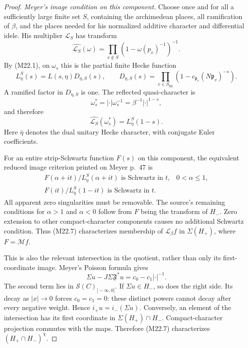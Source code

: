 \begin{proof}
\emph{Meyer's image condition on this component.}
Choose once and for all a sufficiently large finite
set \(S\), containing the archimedean places, all
ramification of \(\beta\), and the places needed for
his normalized additive character and differential
idele.  His multiplier \(\mathcal L_S\) has transform
\[
 \widehat{\mathcal L_S}(\omega)
       =\prod_{v\notin S}(1-\omega(p_v)^{-1})^{-1}.
\]
By (M22.1), on \(\omega_s\) this is the partial finite
Hecke function
\[
 L_\eta^S(s)
       =L(s,\eta)D_{\eta,S}(s),\qquad
 D_{\eta,S}(s)=
        \prod_{v\in S_{\mathrm{fin}}}
             (1-c_{\mathfrak p_v}(N\mathfrak p_v)^{-s}).         \tag{M22.5}
\]
A ramified factor in \(D_{\eta,S}\) is one.
The reflected quasi-character is
\[
 \omega_s^*=|\cdot|\omega_s^{-1}
                    =\beta^{-1}|\cdot|^{1-s},
\]
and therefore
\[
              \widehat{\mathcal L_S}(\omega_s^*)
                       =L_{\bar\eta}^S(1-s).                   \tag{M22.6}
\]
Here \(\bar\eta\) denotes the dual unitary Hecke
character, with conjugate Euler coefficients.

For an entire strip-Schwartz function \(F(s)\)
on this component, the equivalent reduced
image criterion printed on Meyer p.~47 is
\[
 \begin{array}{ll}
 F(\alpha+it)/L_\eta^S(\alpha+it)
        \text{ is Schwartz in }t,&0<\alpha\le1,\\[2mm]
 F(it)/L_{\bar\eta}^S(1-it)
        \text{ is Schwartz in }t.&
 \end{array}                                                    \tag{M22.7}
\]
All apparent zero singularities must be removable.
The source's remaining conditions for
\(\alpha>1\) and \(\alpha<0\) follow from \(F\)
being the transform of \(H_-\).
Zero extension to other compact-character
components causes no additional Schwartz condition.
Thus (M22.7) characterizes membership of
\(\mathcal L_\beta f\) in \(\Sigma(H_+)\),
where \(F=\mathcal Mf\).

This is also the relevant intersection in
the quotient, rather than only its first-coordinate
image.  Meyer's Poisson formula gives
\[
 \Sigma u-J\Sigma\mathfrak F^*u
                         =c_0-c_1|\cdot|^{-1}.
\]
The second term lies in
\(\mathcal S(C)_{]-\infty,0[}\).
If \(\Sigma u\in H_-\), so does the right side.
Its decay as \(|x|\to0\) forces \(c_0=c_1=0\):
these distinct powers cannot decay after every
negative weight.  Hence
\(i_+u=i_-(\Sigma u)\).
Conversely, an element of the intersection has
its first coordinate in \(\Sigma(H_+)\cap H_-\).
Compact-character projection commutes with the
maps.  Therefore (M22.7) characterizes
\((H_+\cap H_-)^\chi\).


\end{proof}
